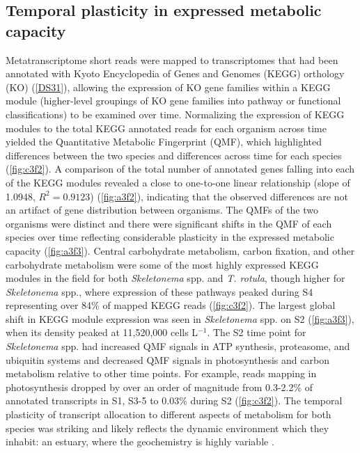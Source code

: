 \subsection{Temporal plasticity in expressed metabolic capacity} 
Metatranscriptome short reads were mapped to transcriptomes that had been annotated with Kyoto Encyclopedia of Genes and Genomes (KEGG) orthology (KO) (\ref{DS31}), allowing the expression of KO gene families within a KEGG module (higher-level groupings of KO gene families into pathway or functional classifications) to be examined over time. Normalizing the expression of KEGG modules to the total KEGG annotated reads for each organism across time yielded the Quantitative Metabolic Fingerprint (QMF), which highlighted differences between the two species and differences across time for each species (\cref{fig:c3f2}). A comparison of the total number of annotated genes falling into each of the KEGG modules revealed a close to one-to-one linear relationship (slope of 1.0948, $R^{2}=0.9123$) (\cref{fig:a3f2}), indicating that the observed differences are not an artifact of gene distribution between organisms. The QMFs of the two organisms were distinct and there were significant shifts in the QMF of each species over time reflecting considerable plasticity in the expressed metabolic capacity (\cref{fig:a3f3}). Central carbohydrate metabolism, carbon fixation, and other carbohydrate metabolism were some of the most highly expressed KEGG modules in the field for both \textit{Skeletonema} spp. and \textit{T. rotula}, though higher for \textit{Skeletonema} spp., where expression of these pathways peaked during S4 representing over 84\% of mapped KEGG reads (\cref{fig:c3f2}). The largest global shift in KEGG module expression was seen in \textit{Skeletonema} spp. on S2 (\cref{fig:a3f3}), when its density peaked at 11,520,000 cells L$^{-1}$. The S2 time point for \textit{Skeletonema} spp. had increased QMF signals in ATP synthesis, proteasome, and ubiquitin systems and decreased QMF signals in photosynthesis and carbon metabolism relative to other time points. For example, reads mapping in photosynthesis dropped by over an order of magnitude from 0.3-2.2\% of annotated transcripts in S1, S3-5 to 0.03\% during S2 (\cref{fig:c3f2}). The temporal plasticity of transcript allocation to different aspects of metabolism for both species was striking and likely reflects the dynamic environment which they inhabit: an estuary, where the geochemistry is highly variable \citep{Nixon1995}.\par
